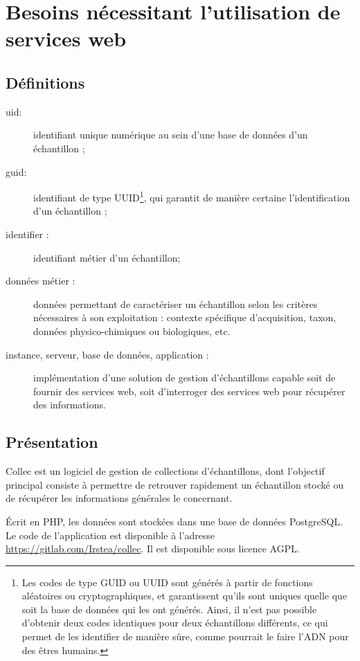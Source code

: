 \chapter{Besoins nécessitant l'utilisation de services web}

\section{Définitions}

\begin{description}
\item[uid:] identifiant unique numérique au sein d'une base de données d'un échan\-tillon ;
\item[guid:] identifiant de type UUID\footnote{Les codes de type GUID ou UUID sont générés à partir de fonctions aléatoires ou cryptographiques, et garantissent qu'ils sont uniques quelle que soit la base de données qui les ont générés. Ainsi, il n'est pas possible d'obtenir deux codes identiques pour deux échantillons différents, ce qui permet de les identifier de manière sûre, comme pourrait le faire l'ADN pour des êtres humains.}, qui garantit de manière certaine l'identification d'un échantillon ;
\item [identifier :] identifiant \og métier \fg{} d'un échantillon;
\item [données \og métier \fg{} :] données permettant de caractériser un échantillon selon les critères nécessaires à son exploitation : contexte spécifique d'acquisition, taxon, données physico-chimiques ou biologiques, etc.
\item [instance, serveur, base de données, application :] implémentation d'une solution de gestion d'échantillons capable soit de fournir des services web, soit d'interroger des services web pour récupérer des informations.
\end{description}
\section{Présentation}
Collec est un logiciel de gestion de collections d'échantillons, dont l'objectif principal consiste à permettre de retrouver rapidement un échantillon stocké ou de récupérer les informations générales le concernant.

Écrit en PHP, les données sont stockées dans une base de données PostgreSQL. Le code de l'application est disponible à l'adresse \url{https://gitlab.com/Irstea/collec}. Il est disponible sous licence AGPL.

